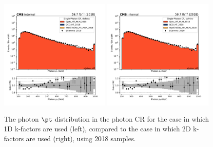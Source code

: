 \begin{figure}
    \begin{center}
        \includegraphics[width=0.49\textwidth]{fig/datamc/cr_g_vbf/cr_g_vbf_photon_pt0_losf_2018.pdf}
        \includegraphics[width=0.49\textwidth]{fig/datamc_2dkfac/cr_g_vbf/cr_g_vbf_photon_pt0_losf_2018.pdf} 
        \caption{The photon $\pt$ distribution in the photon CR for the case in which 1D k-factors are used (left), 
        compared to the case in which 2D k-factors are used (right), using 2018 samples.}
        \label{fig:photon_pt_2018}
    \end{center}
\end{figure}


